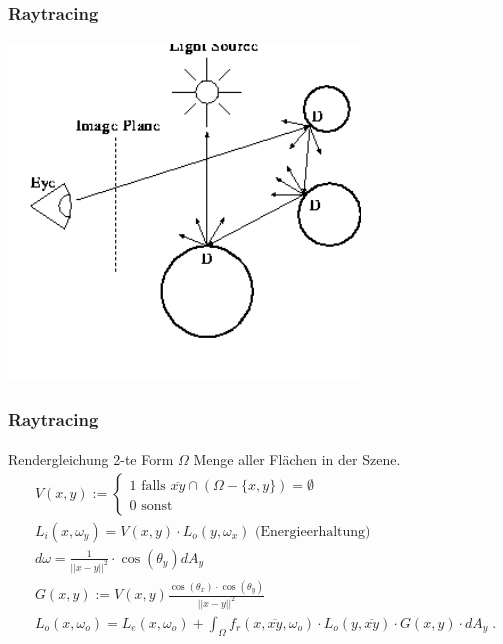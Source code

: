 \documentclass{beamer}
\begin{document}
\begin{frame}
    \frametitle{Raytracing}
\framesubtitle{}

  \begin{center}
    \includegraphics[width=0.7\textwidth]{images/rayTracing}
\end{center}

\end{frame}



\begin{frame}
    \frametitle{Raytracing}
\framesubtitle{}
\begin{block}{Rendergleichung 2-te Form}
 $\Omega$  Menge aller Flächen  in der Szene.
\begin{align*}
& V(x,y) := \begin{cases}
 1 \text{ falls } \overline{xy} \cap (\Omega -\{x,y\}) = \emptyset \\
0 \text{ sonst }
\end{cases} \\
& L_i(x, \omega_y) = V(x,y) \cdot L_o(y, \omega_x) \text{ (Energieerhaltung)} \\
& d\omega =  \frac{1}{||x -y||^2} \cdot  \cos(\theta_y) dA_y \\
& G(x,y) := V(x,y)  \frac{ \cos(\theta_x) \cdot  \cos(\theta_y)}{||x -y||^2} \\
& L_o(x, \omega_o) = L_e(x, \omega_o)  + \displaystyle \int_{\Omega} f_r (x, \overline{xy}, \omega_o) \cdot   L_o(y, \overline{xy})  \cdot  G(x,y) \cdot   dA_y \; .
\end{align*} 
\end{block}
\end{frame}
\end{document}
